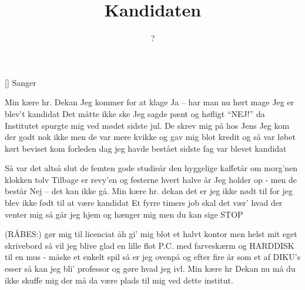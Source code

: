 \documentclass[a4paper,11pt]{article}
\title{Kandidaten}
\author{?}
\begin{document}
\maketitle

\begin{roles}
[] Sanger
\end{roles}

\begin{song}
  Min kære hr. Dekan
  Jeg kommer for at klage
  Ja -- har man nu hørt mage
  Jeg er blev't kandidat
  Det måtte ikke ske
  Jeg sagde pænt og høfligt "`NEJ!"'
  da Institutet spurgte mig
  ved mødet sidste jul.
  De skrev mig på hos Jens
  Jeg kom der godt nok ikke
  men de var mere kvikke
  og gav mig blot kredit
  og så var løbet kørt
  beviset kom forleden dag
  jeg havde bestået sidste fag
  var blevet kandidat

  Så var det altså slut
  de femten gode studieår
  den hyggelige kaffetår
  om morg'nen klokken tolv
  Tilbage er revy'en
  og festerne hvert halve år
  Jeg holder op - men de består
  Nej -- det kan ikke gå.
  Min kære hr. dekan
  det er jeg ikke nødt til
  for jeg blev ikke født til
  at være kandidat
  Et fyrre timers job
  skal det vær' hvad der venter mig
  så går jeg hjem og hænger mig
  men du kan sige STOP

  (RÅBES:) gør mig til licenciat
  åh gi' mig blot et halvt kontor
  men helst mit eget skrivebord
  så vil jeg blive glad
  en lille flot P.C.
  med farveskærm og HARDDISK til
  en mus - måske et enkelt spil
  så er jeg ovenpå
  og efter fire år
  som et af DIKU's esser
  så kan jeg bli' professor
  og gøre hvad jeg ivl.
  Min kære hr Dekan
  nu må du ikke skuffe mig
  der må da være plads til mig
  ved dette institut.
\end{song}
\end{document}
